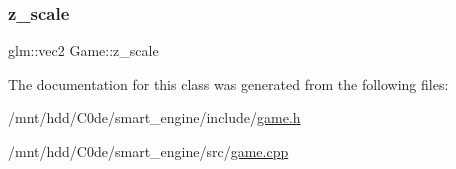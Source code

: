\mbox{\label{classGame_a84e44c43ed2393f78eb7d1db35af59aa}} 
\subsubsection{\texorpdfstring{z\+\_\+scale}{z\_scale}}
{\footnotesize\ttfamily glm\+::vec2 Game\+::z\+\_\+scale\hspace{0.3cm}{\ttfamily [private]}}



The documentation for this class was generated from the following files\+:\begin{DoxyCompactItemize}
\item 
/mnt/hdd/\+C0de/smart\+\_\+engine/include/\hyperlink{game_8h}{game.\+h}\item 
/mnt/hdd/\+C0de/smart\+\_\+engine/src/\hyperlink{game_8cpp}{game.\+cpp}\end{DoxyCompactItemize}
